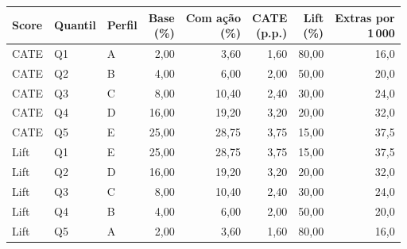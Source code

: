 \begin{tabular}{lllrrrrr}
\toprule
Score & Quantil & Perfil & \shortstack{Base\\(\%)} & \shortstack{Com ação\\(\%)} & \shortstack{CATE\\(p.p.)} & \shortstack{Lift\\(\%)} & \shortstack{Extras por\\1\,000} \\
\midrule
CATE & Q1 & A & 2,00 & 3,60 & 1,60 & 80,00 & 16,0 \\
CATE & Q2 & B & 4,00 & 6,00 & 2,00 & 50,00 & 20,0 \\
CATE & Q3 & C & 8,00 & 10,40 & 2,40 & 30,00 & 24,0 \\
CATE & Q4 & D & 16,00 & 19,20 & 3,20 & 20,00 & 32,0 \\
CATE & Q5 & E & 25,00 & 28,75 & 3,75 & 15,00 & 37,5 \\
Lift & Q1 & E & 25,00 & 28,75 & 3,75 & 15,00 & 37,5 \\
Lift & Q2 & D & 16,00 & 19,20 & 3,20 & 20,00 & 32,0 \\
Lift & Q3 & C & 8,00 & 10,40 & 2,40 & 30,00 & 24,0 \\
Lift & Q4 & B & 4,00 & 6,00 & 2,00 & 50,00 & 20,0 \\
Lift & Q5 & A & 2,00 & 3,60 & 1,60 & 80,00 & 16,0 \\
\bottomrule
\end{tabular}
